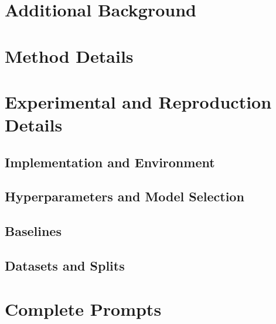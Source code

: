 
\section{Additional Background}\label{app:background}

\section{Method Details}\label{app:method}

\section{Experimental and Reproduction Details}\label{app:reproduction}
\subsection{Implementation and Environment}
\subsection{Hyperparameters and Model Selection}
\subsection{Baselines}
\subsection{Datasets and Splits}

\section{Complete Prompts}\label{app:prompts}

